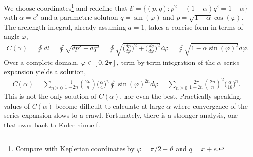 \documentclass[nofootinbib,preprint]{revtex4-1}
\begin{document}
We choose coordinates\footnote{Compare with Keplerian coordinates by
$\varphi=\pi/2-\vartheta$ and $q=x+e$.} and redefine that  
$\mathcal{E}=\{(p,q):p^2+(1-\alpha)q^2=1-\alpha \}$ with $\alpha = e^2$ and
a parametric solution $q = \sin(\varphi)$ and $p=\sqrt{1-\alpha}\cos(\varphi)$.
The arclength integral, already assuming $a=1$, takes a concise form in terms 
of angle $\varphi$,
\begin{eqnarray}
C(\alpha) = \oint dl = \oint \sqrt{dp^2+dq^2} 
= \oint \sqrt{\bigg(\frac{dp}{d\varphi}\bigg)^2+\bigg(\frac{dq}{d\varphi}\bigg)^2}d\varphi 
= \oint \sqrt{1-\alpha\sin(\varphi)^2} d\varphi . \nonumber
\end{eqnarray}
Over a complete domain, $\varphi \in [0,2\pi]$, term-by-term integration of the 
$\alpha$-series expansion yields a solution,
\begin{eqnarray}
C(\alpha) = \sum_{n \ge 0}\frac{1}{1-2n}\binom{2n}{n}\bigg(\frac{\alpha}{4}\bigg)^{n}\oint \sin(\varphi)^{2n} d\varphi
= \sum_{n \ge 0}\frac{2\pi}{1-2n}\binom{2n}{n}^2\bigg(\frac{\alpha}{16}\bigg)^{n}. \nonumber  
\end{eqnarray}
This is not the only solution of $C(\alpha)$, nor even the best. Practically speaking,
values of $C(\alpha)$ become difficult to calculate at large $\alpha$ where convergence of the 
series expansion slows to a crawl. Fortunately, there is a stronger analysis, one that 
owes back to Euler himself.
\end{document}
